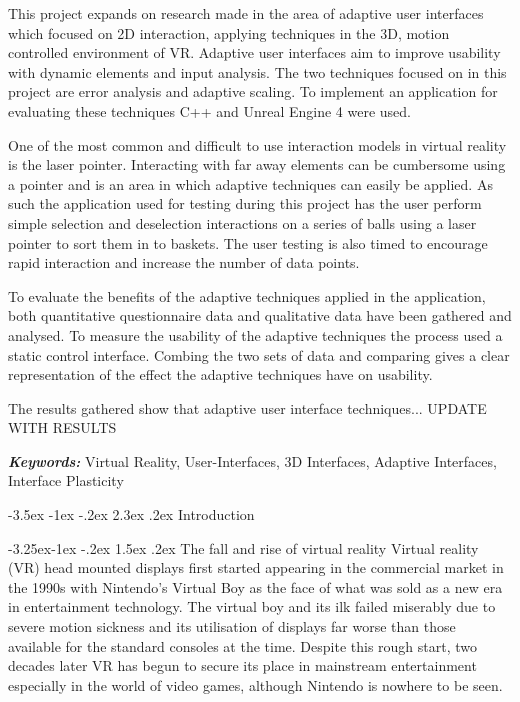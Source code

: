 \documentclass[12pt]{article}
\makeatletter
\providecommand{\keywords}[1]
{\textbf{\textit{Keywords: }} #1}
\renewcommand{\section}{\@startsection {section}{1}{\z@}%
             {-3.5ex \@plus -1ex \@minus -.2ex}%
             {2.3ex \@plus .2ex}%
             {\normalfont\Large\scshape\bfseries}}
\renewcommand{\subsection}{\@startsection{subsection}{2}{\z@}%
             {-3.25ex\@plus -1ex \@minus -.2ex}%
             {1.5ex \@plus .2ex}%
             {\normalfont\large\scshape\bfseries}}
\makeatother
\begin{document}
This project expands on research made in the area of adaptive user interfaces which focused on 2D interaction, applying techniques in the 3D, motion controlled environment of VR. Adaptive user interfaces aim to improve usability with dynamic elements and input analysis. The two techniques focused on in this project are error analysis and adaptive scaling. To implement an application for evaluating these techniques C++ and Unreal Engine 4 were used.

One of the most common and difficult to use interaction models in virtual reality is the laser pointer. Interacting with far away elements can be cumbersome using a pointer and is an area in which adaptive techniques can easily be applied. As such the application used for testing during this project has the user perform simple selection and deselection interactions on a series of balls using a laser pointer to sort them in to baskets. The user testing is also timed to encourage rapid interaction and increase the number of data points.

To evaluate the benefits of the adaptive techniques applied in the application, both quantitative questionnaire data and qualitative data have been gathered and analysed. To measure the usability of the adaptive techniques the process used a static control interface. Combing the two sets of data and comparing gives a clear representation of the effect the adaptive techniques have on usability.

The results gathered show that adaptive user interface techniques... UPDATE WITH RESULTS

\keywords{Virtual Reality, User-Interfaces, 3D Interfaces, Adaptive Interfaces, Interface Plasticity}

\section{Introduction}

\subsection{The fall and rise of virtual reality}
Virtual reality (VR) head mounted displays first started appearing in the commercial market in the 1990s with Nintendo's Virtual Boy as the face of what was sold as a new era in entertainment technology. The virtual boy and its ilk failed miserably due to severe motion sickness and its utilisation of displays far worse than those available for the standard consoles at the time. Despite this rough start, two decades later VR has begun to secure its place in mainstream entertainment especially in the world of video games, although Nintendo is nowhere to be seen. 
\end{document}
